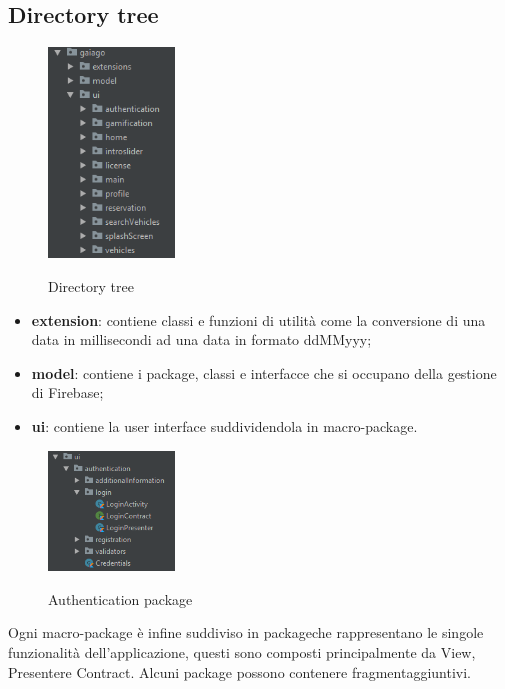 \subsection{Directory tree}
\begin{figure}[H]
	\centering
	\includegraphics[width=0.3\textwidth]
	{res/images/directorytree.png}\\
	\caption{Directory tree}
	\label{Directory Tree}
\end{figure}
\begin{itemize}
	\item \textbf{extension}: contiene classi e funzioni di utilità come la conversione di una data in millisecondi ad una data in formato ddMMyyy;
	\item \textbf{model}: contiene i package\glo, classi e interfacce che si occupano della gestione di Firebase\glo;
	\item \textbf{ui}: contiene la user interface suddividendola in macro-package.
\end{itemize}
\begin{figure}[H]
	\centering
	\includegraphics[width=0.3\textwidth]
	{res/images/authentication.png}\\
	\caption{Authentication package}
	\label{Authentication package}
\end{figure}
Ogni macro-package è infine suddiviso in package\glosp che rappresentano le singole funzionalità dell'applicazione, questi sono composti principalmente da View\glosp, Presenter\glosp e Contract\glo. Alcuni package possono contenere fragment\glosp aggiuntivi.